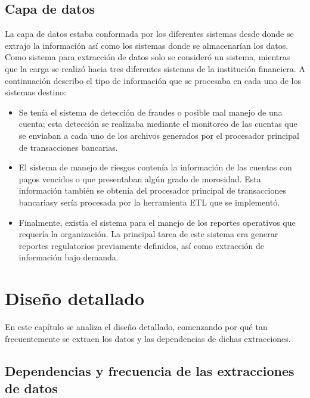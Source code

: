 \documentclass[a4paper,openright,12pt]{book}
\begin{document}
\section{Capa de datos}

La capa de datos estaba conformada por los diferentes sistemas desde donde se
extrajo la información así como los sistemas donde se almacenarían los
datos. Como sistema para extracción de datos solo se consideró un sistema,
mientras que la carga se realizó hacia tres diferentes sistemas de la
institución financiera. A continuación describo el tipo de información que se
procesaba en cada uno de los sistemas destino:

\begin{itemize}

\item Se tenía el sistema de detección de fraudes o posible mal manejo de una
  cuenta; esta detección se realizaba mediante el monitoreo de las cuentas que
  se enviaban a cada uno de los archivos generados por el procesador principal
  de transacciones bancarias.

\item El sistema de manejo de riesgos contenía la información de las cuentas
  con pagos vencidos o que presentaban algún grado de morosidad. Esta
  información también se obtenía del procesador principal de transacciones
  bancariasy sería procesada por la herramienta ETL que se implementó.

\item Finalmente, existía el sistema para el manejo de los reportes operativos
  que requería la organización. La principal tarea de este sistema era generar
  reportes regulatorios previamente definidos, así como extracción de
  información bajo demanda.
\end{itemize}

\chapter{Diseño detallado}

En este capítulo se analiza el diseño detallado, comenzando por qué tan
frecuentemente se extraen los datos y las dependencias de dichas extracciones.

\section{Dependencias y frecuencia de las extracciones de datos}
\end{document}
